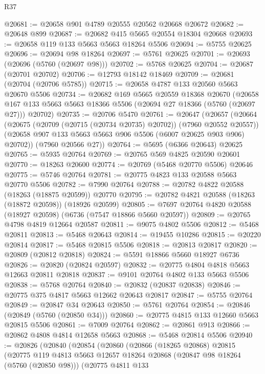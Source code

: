 \begin{lexlean}{R37}
\begin{coremodule}
@20681 := @20658 @901 @4789 @20555 @20562 @20668 @20672
@20682 := @20648 @899
@20687 := @20682 @415 @5665 @20554 @18304 @20668
@20693 := @20658 @119 @133 @5663 @5663 @18264 @5506
@20694 := @5755 @20625
@20696 := @20694 @98 @18264
@20697 := @5761 @20625
@20701 := @20693 (@20696 (@5760 (@20697 @98)))
@20702 := @5768 @20625
@20704 := @20687 (@20701 @20702)
@20706 := @12793 @18142 @18469
@20709 := @20681 (@20704 (@20706 @5785))
@20715 := @20658 @4787 @133 @20560 @5663 @20670 @5506
@20734 := @20682
    @169
    @5665
    @20559
    @18368
    @20670
    (@20658 @167 @133 @5663 @5663 @18366 @5506 (@20694 @27 @18366 (@5760 (@20697 @27))) @20702)
@20735 := @20706 @5470
@20761 := @20647
    (@20657
      (@20664
        (@20675 (@20709 (@20715 (@20734 @20735) @20702)) (@7960 @20552 @20557))
        (@20658 @907 @133 @5663 @5663 @906 @5506 (@6007 @20625 @903 @906) @20702))
      (@7960 @20566 @27))
@20764 := @5695 (@6366 @20643) @20625
@20765 := @5935 @20764
@20769 := @20765 @569 @4825 @20590 @20601
@20770 := @18263 @20600
@20774 := @20769 (@5468 @20770 @5506) @20646
@20775 := @5746 @20764
@20781 := @20775 @4823 @133 @20588 @5663 @20770 @5506
@20782 := @7990 @20764
@20788 := @20782 @4822 @20588 (@18263 (@18875 @20599)) @20770
@20795 := @20782 @4821 @20588 (@18263 (@18872 @20598)) (@18926 @20599)
@20805 := @7697 @20764 @4820 @20588 (@18927 @20598) (@6736 (@7547 @18866 @5660 @20597))
@20809 := @20765 @4798 @4819 @12664 @20587
@20811 := @9075 @4802 @5506
@20812 := @5468 @20811
@20813 := @5468 @20643
@20814 := @19455 @10286
@20815 := @20220 @20814
@20817 := @5468 @20815 @5506
@20818 := @20813 @20817
@20820 := @20809 (@20812 @20818)
@20824 := @5591 @18866 @5660 @18927 @6736
@20826 := @20820 (@20824 @20597)
@20832 := @20775 @4804 @4818 @5663 @12663 @20811 @20818
@20837 := @9101 @20764 @4802 @133 @5663 @5506
@20838 := @5768 @20764
@20840 := @20832 (@20837 @20838)
@20846 := @20775 @375 @4817 @5663 @12662 @20643 @20817
@20847 := @5755 @20764
@20849 := @20847 @34 @20643
@20850 := @5761 @20764
@20854 := @20846 (@20849 (@5760 (@20850 @34)))
@20860 := @20775 @4815 @133 @12660 @5663 @20815 @5506
@20861 := @7009 @20764
@20862 := @20861 @913
@20866 := @20862 @4808 @4814 @12658 @5663
@20868 := @5468 @20814 @5506
@20940 := @20826
    (@20840
      (@20854
        (@20860
          (@20866
            (@18265 @20868)
            @20815
            (@20775
              @119
              @4813
              @5663
              @12657
              @18264
              @20868
              (@20847 @98 @18264 (@5760 (@20850 @98)))
              (@20775
                @4811
                @133

\end{coremodule}
\end{lexlean}
